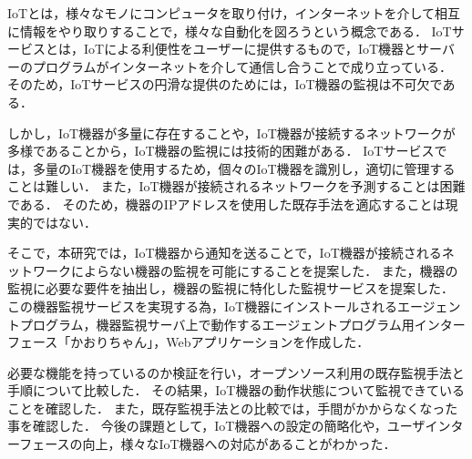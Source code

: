 IoTとは，様々なモノにコンピュータを取り付け，インターネットを介して相互に情報をやり取りすることで，様々な自動化を図ろうという概念である．
IoTサービスとは，IoTによる利便性をユーザーに提供するもので，IoT機器とサーバーのプログラムがインターネットを介して通信し合うことで成り立っている．
そのため，IoTサービスの円滑な提供のためには，IoT機器の監視は不可欠である．
\medskip

しかし，IoT機器が多量に存在することや，IoT機器が接続するネットワークが多様であることから，IoT機器の監視には技術的困難がある．
IoTサービスでは，多量のIoT機器を使用するため，個々のIoT機器を識別し，適切に管理することは難しい．
また，IoT機器が接続されるネットワークを予測することは困難である．
そのため，機器のIPアドレスを使用した既存手法を適応することは現実的ではない．
\medskip

そこで，本研究では，IoT機器から通知を送ることで，IoT機器が接続されるネットワークによらない機器の監視を可能にすることを提案した．
また，機器の監視に必要な要件を抽出し，機器の監視に特化した監視サービスを提案した．
この機器監視サービスを実現する為，IoT機器にインストールされるエージェントプログラム，機器監視サーバ上で動作するエージェントプログラム用インターフェース「かおりちゃん」，Webアプリケーションを作成した．
\medskip

必要な機能を持っているのか検証を行い，オープンソース利用の既存監視手法と手順について比較した．
その結果，IoT機器の動作状態について監視できていることを確認した．
また，既存監視手法との比較では，手間がかからなくなった事を確認した．
今後の課題として，IoT機器への設定の簡略化や，ユーザインターフェースの向上，様々なIoT機器への対応があることがわかった．

